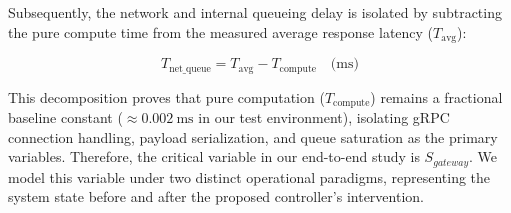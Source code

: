 \documentclass{ieeeaccess}
\begin{document}
Subsequently, the network and internal queueing delay is isolated by subtracting the pure compute time from the measured average response latency ($T_{\text{avg}}$):

\begin{equation}
	\label{eq:t-net}
	T_{\text{net\_queue}} = T_{\text{avg}} - T_{\text{compute}} \quad \text{(ms)}
\end{equation}

This decomposition proves that pure computation ($T_{\text{compute}}$) remains a fractional baseline constant ($\approx 0.002\ \text{ms}$ in our test environment), isolating gRPC connection handling, payload serialization, and queue saturation as the primary variables. Therefore, the critical variable in our end-to-end study is $S_{gateway}$. We model this variable under two distinct operational paradigms, representing the system state before and after the proposed controller's intervention.

\end{document}
